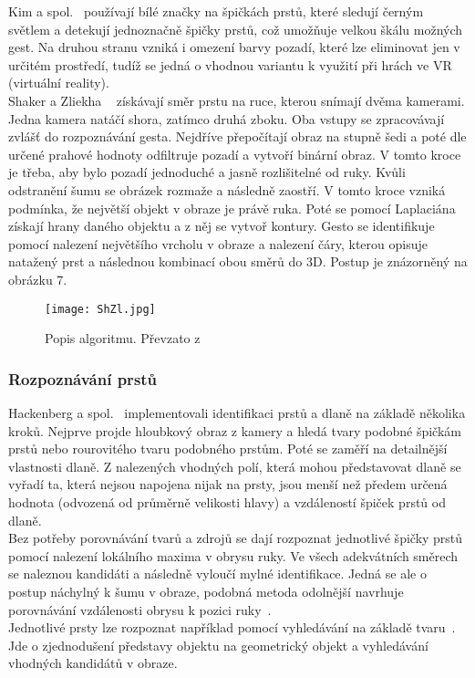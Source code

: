 Kim a spol.~\cite{5} používají bílé značky na špičkách prstů, které sledují černým světlem a detekují jednoznačně špičky prstů, což umožňuje velkou škálu možných gest. Na druhou stranu vzniká i omezení barvy pozadí, které lze eliminovat jen v určitém prostředí, tudíž se jedná o vhodnou variantu k využití při hrách ve VR (virtuální reality).\\

Shaker a Zliekha ~\cite{12} získávají směr prstu na ruce, kterou snímají dvěma kamerami. Jedna kamera natáčí shora, zatímco druhá zboku. Oba vstupy se zpracovávají zvlášť do rozpoznávání gesta. Nejdříve přepočítají obraz na stupně šedi a poté dle určené prahové hodnoty odfiltruje pozadí a vytvoří binární obraz. V tomto kroce je třeba, aby bylo pozadí jednoduché a jasně rozlišitelné od ruky. Kvůli odstranění šumu se obrázek rozmaže a následně zaostří. V tomto kroce vzniká podmínka, že největší objekt v obraze je právě ruka. Poté se pomocí Laplaciána získají hrany daného objektu a z něj se vytvoř kontury.
Gesto se identifikuje pomocí nalezení největšího vrcholu v obraze a nalezení čáry, kterou opisuje natažený prst a následnou kombinací obou směrů do 3D. Postup je znázorněný na obrázku 7.
\begin{figure}[h]
\centering
\texttt{[image: ShZl.jpg]}
\caption{Popis algoritmu. Převzato z ~\cite{12} } 
\end{figure}

\subsubsection{Rozpoznávání prstů}
Hackenberg a spol.~\cite{12} implementovali identifikaci prstů a dlaně na základě několika kroků. Nejprve projde hloubkový obraz z kamery a hledá tvary podobné špičkám prstů nebo rourovitého tvaru podobného prstům. Poté se zaměří na detailnější vlastnosti dlaně. Z nalezených vhodných polí, která mohou představovat dlaně se vyřadí ta, která nejsou napojena nijak na prsty, jsou menší než předem určená hodnota (odvozená od průměrně velikosti hlavy) a vzdáleností špiček prstů od dlaně.\\


Bez potřeby porovnávání tvarů a zdrojů se dají rozpoznat jednotlivé špičky prstů pomocí nalezení lokálního maxima v obrysu ruky. Ve všech adekvátních směrech se naleznou kandidáti a následně vyloučí mylné identifikace. Jedná se ale o postup náchylný k šumu v obraze, podobná metoda odolnější navrhuje porovnávání vzdálenosti obrysu k pozici ruky~\cite{3}.\\
Jednotlivé prsty lze rozpoznat například pomocí vyhledávání na základě tvaru~\cite{4}. Jde o zjednodušení představy objektu na geometrický objekt a vyhledávání vhodných kandidátů v obraze. 

